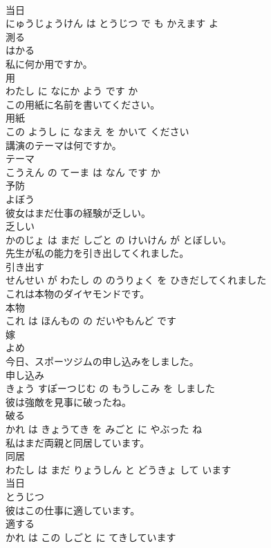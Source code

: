 \documentclass[8pt]{extreport}
\begin{document}
\begin{CJK}{UTF8}{min}
\\	当日 
\\	にゅうじょうけん は とうじつ で も かえます よ			
\\	測る	
\\	はかる		
\\	私に何か用ですか。	
\\	用 
\\	わたし に なにか よう です か			
\\	この用紙に名前を書いてください。	
\\	用紙 
\\	この ようし に なまえ を かいて ください			
\\	講演のテーマは何ですか。	
\\	テーマ 
\\	こうえん の てーま は なん です か			
\\	予防	
\\	よぼう		
\\	彼女はまだ仕事の経験が乏しい。	
\\	乏しい 
\\	かのじょ は まだ しごと の けいけん が とぼしい。			
\\	先生が私の能力を引き出してくれました。	
\\	引き出す 
\\	せんせい が わたし の のうりょく を ひきだしてくれました			
\\	これは本物のダイヤモンドです。	
\\	本物 
\\	これ は ほんもの の だいやもんど です			
\\	嫁	
\\	よめ		
\\	今日、スポーツジムの申し込みをしました。	
\\	申し込み 
\\	きょう すぽーつじむ の もうしこみ を しました			
\\	彼は強敵を見事に破ったね。	
\\	破る 
\\	かれ は きょうてき を みごと に やぶった ね			
\\	私はまだ両親と同居しています。	
\\	同居 
\\	わたし は まだ りょうしん と どうきょ して います			
\\	当日	
\\	とうじつ		
\\	彼はこの仕事に適しています。	
\\	適する 
\\	かれ は この しごと に てきしています			

\end{CJK}
\end{document}
